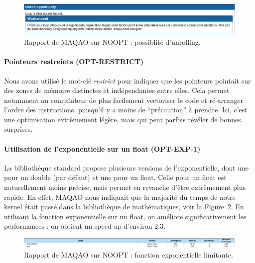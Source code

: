 \documentclass[12pt,a4paper]{article}
\begin{document}
\begin{figure}[ht]
    \centering
    \includegraphics[scale=0.4]{./figures/L1/maqao_noopt_unroll.png}
    \caption{Rapport de MAQAO sur NOOPT : possiblité d'unrolling.}
    \label{fig.maqao_noopt_unroll}
\end{figure}

\paragraph{Pointeurs restreints (OPT-RESTRICT)}
Nous avons utilisé le mot-clé \textit{restrict} pour indiquer que les pointeurs
pointait sur des zones de mémoire distinctes et indépendantes entre elles. Cela
permet notamment au compilateur de plus facilement vectoriser le code et
ré-arranger l'ordre des instructions, puisqu'il y a moins de
\enquote{précaution} à prendre. Ici, c'est une optimisation extrêmement légère,
mais qui peut parfois révéler de bonnes surprises.

\paragraph{Utilisation de l'exponentielle sur un float (OPT-EXP-1)} La
bibliothèque standard propose plusieurs versions de l'exponentielle, dont une
pour un double (par défaut) et une pour un float. Celle pour un float est
naturellement moins précise, mais permet en revanche d'être extrêmement plus
rapide. En effet, MAQAO nous indiquait que la majorité du temps de notre kernel
était passé dans la bibliothèque de mathématiques, voir la
Figure~\ref{fig.maqao_noopt_bottleneck}. En utilisant la fonction exponentielle
sur un float, on améliore significativement les performances : on obtient un
speed-up d'environ $2.3$.

\begin{figure}[ht]
    \centering
    \includegraphics[scale=0.25]{./figures/L1/maqao_noopt_bottleneck.png}
    \caption{Rapport de MAQAO sur NOOPT : fonction exponentielle limitante.}
    \label{fig.maqao_noopt_bottleneck}
\end{figure}
\end{document}
